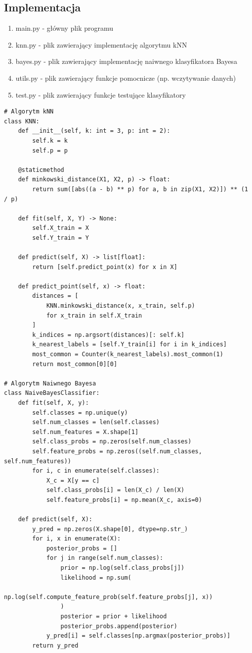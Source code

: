 \documentclass[12pt,a4paper]{article}
\begin{document}
\subsection{Implementacja}
\begin{enumerate}
	\item main.py - główny plik programu
	\item knn.py - plik zawierający implementację algorytmu kNN
	\item bayes.py - plik zawierający implementację naiwnego klasyfikatora Bayesa
	\item utils.py - plik zawierający funkcje pomocnicze (np. wczytywanie danych)
	\item test.py - plik zawierający funkcje testujące klasyfikatory
\end{enumerate}
\begin{lstlisting}
# Algorytm kNN
class KNN:
    def __init__(self, k: int = 3, p: int = 2):
        self.k = k
        self.p = p

    @staticmethod
    def minkowski_distance(X1, X2, p) -> float:
        return sum([abs((a - b) ** p) for a, b in zip(X1, X2)]) ** (1 / p)

    def fit(self, X, Y) -> None:
        self.X_train = X
        self.Y_train = Y

    def predict(self, X) -> list[float]:
        return [self.predict_point(x) for x in X]

    def predict_point(self, x) -> float:
        distances = [
            KNN.minkowski_distance(x, x_train, self.p)
            for x_train in self.X_train
        ]
        k_indices = np.argsort(distances)[: self.k]
        k_nearest_labels = [self.Y_train[i] for i in k_indices]
        most_common = Counter(k_nearest_labels).most_common(1)
        return most_common[0][0]

# Algorytm Naiwnego Bayesa
class NaiveBayesClassifier:
    def fit(self, X, y):
        self.classes = np.unique(y)
        self.num_classes = len(self.classes)
        self.num_features = X.shape[1]
        self.class_probs = np.zeros(self.num_classes)
        self.feature_probs = np.zeros((self.num_classes, self.num_features))
        for i, c in enumerate(self.classes):
            X_c = X[y == c]
            self.class_probs[i] = len(X_c) / len(X)
            self.feature_probs[i] = np.mean(X_c, axis=0)

    def predict(self, X):
        y_pred = np.zeros(X.shape[0], dtype=np.str_)
        for i, x in enumerate(X):
            posterior_probs = []
            for j in range(self.num_classes):
                prior = np.log(self.class_probs[j])
                likelihood = np.sum(
                    np.log(self.compute_feature_prob(self.feature_probs[j], x))
                )
                posterior = prior + likelihood
                posterior_probs.append(posterior)
            y_pred[i] = self.classes[np.argmax(posterior_probs)]
        return y_pred


\end{lstlisting}
\end{document}
